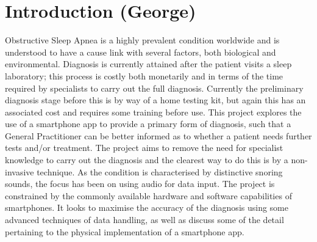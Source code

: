 \chapter{Introduction (George)}
\label{ch:introduction}

Obstructive Sleep Apnea is a highly prevalent condition worldwide and is understood to have a cause link with several factors, both biological and environmental. Diagnosis is currently attained after the patient visits a sleep laboratory; this process is costly both monetarily and in terms of the time required by specialists to carry out the full diagnosis. Currently the preliminary diagnosis stage before this is by way of a home testing kit, but again this has an associated cost and requires some training before use.
This project explores the use of a smartphone app to provide a primary form of diagnosis, such that a General Practitioner can be better informed as to whether a patient needs further tests and/or treatment. The project aims to remove the need for specialist knowledge to carry out the diagnosis and the clearest way to do this is by a non-invasive technique. As the condition is characterised by distinctive snoring sounds, the focus has been on using audio for data input. The project is constrained by the commonly available hardware and software capabilities of smartphones. It looks to maximise the accuracy of the diagnosis using some advanced techniques of data handling, as well as discuss some of the detail pertaining to the physical implementation of a smartphone app.